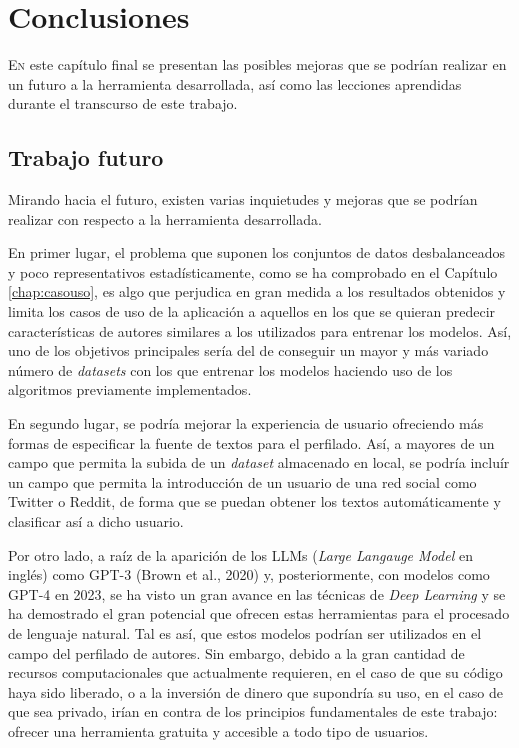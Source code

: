 \chapter{Conclusiones}
\label{chap:conclusiones}

\lettrine{E}{n} este capítulo final se presentan las posibles mejoras que se podrían realizar en un futuro a la herramienta desarrollada,
así como las lecciones aprendidas durante el transcurso de este trabajo.


\section{Trabajo futuro}
\label{sec:trabajo_futuro}

Mirando hacia el futuro, existen varias inquietudes y mejoras que se podrían realizar con respecto a la herramienta desarrollada.

\bigskip
En primer lugar, el problema que suponen los conjuntos de datos desbalanceados y poco representativos estadísticamente, como se ha comprobado en el Capítulo \ref{chap:casouso},
es algo que perjudica en gran medida a los resultados obtenidos y limita los casos de uso de la aplicación a aquellos en los que se quieran predecir características
de autores similares a los utilizados para entrenar los modelos. Así, uno de los objetivos principales sería del de conseguir un mayor y más variado número de \textit{datasets}
con los que entrenar los modelos haciendo uso de los algoritmos previamente implementados.

\bigskip
En segundo lugar, se podría mejorar la experiencia de usuario ofreciendo más formas de especificar la fuente de textos para el perfilado.
Así, a mayores de un campo que permita la subida de un \textit{dataset} almacenado en local, se podría incluír un campo que permita la introducción
de un usuario de una red social como Twitter o Reddit, de forma que se puedan obtener los textos automáticamente y clasificar así a dicho usuario.

\bigskip
Por otro lado, a raíz de la aparición de los LLMs (\textit{Large Langauge Model} en inglés) como GPT-3 (Brown et al., 2020) \cite{brown2020language}
y, posteriormente, con modelos como GPT-4 en 2023, se ha visto un gran avance en las técnicas de \textit{Deep Learning}
y se ha demostrado el gran potencial que ofrecen estas herramientas para el procesado de lenguaje natural. Tal es así, que estos modelos
podrían ser utilizados en el campo del perfilado de autores. Sin embargo, debido a la gran cantidad de recursos
computacionales que actualmente requieren, en el caso de que su código haya sido liberado, o a la inversión de dinero que supondría su uso, en el caso
de que sea privado, irían en contra de los principios fundamentales de este trabajo: ofrecer una herramienta gratuita
y accesible a todo tipo de usuarios.

